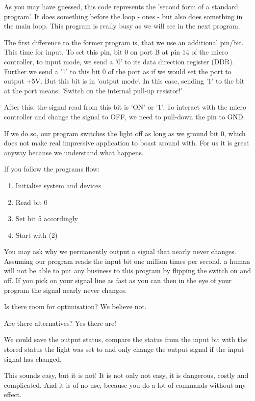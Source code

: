 As you may have guessed, this code represents the 'second form of a standard program'. It does something before the loop - ones - but also does something in the main loop. This program is really busy as we will see in the next program.

The first difference to the former program is, that we use an additional pin/bit. This time for input. To set this pin, bit 0 on port B at pin 14 of the micro controller, to input mode, we send a '0' to its data direction register (DDR). Further we send a '1' to this bit 0 of the port as if we would set the port to output +5V. But this bit is in 'output mode'. In this case, sending '1' to the bit at the port means: 'Switch on the internal pull-up resistor!'

After this, the signal read from this bit is 'ON' or '1'. To interact with the micro controller and change the signal to OFF, we need to pull-down the pin to GND.

If we do so, our program switches the light off as long as we ground bit 0, which does not make real impressive application to boast around with. For us it is great anyway because we understand what happens.

If you follow the programs flow:

\begin{enumerate}
  \item Initialise system and devices
  \item Read bit 0
  \item Set bit 5 accordingly
  \item Start with (2)
\end{enumerate}

You may ask why we permanently output a signal that nearly never changes. Assuming our program reads the input bit one million times per second, a human will not be able to put any business to this program by flipping the switch on and off. If you pick on your signal line as fast as you can then in the eye of your program the signal nearly never changes.

Is there room for optimisation? We believe not.

Are there alternatives? Yes there are!

We could save the output status, compare the status from the input bit with the stored status the light was set to and only change the output signal if the input signal has changed.

This sounds easy, but it is not! It is not only not easy, it is dangerous, costly and complicated. And it is of no use, because you do a lot of commands without any effect.

